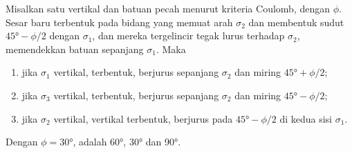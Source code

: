 \begin{theorem}\label{thm:b1:faults-folds-fabrics:anderson}
Misalkan satu  vertikal dan batuan pecah menurut kriteria Coulomb, dengan  $\phi$. Sesar baru terbentuk pada bidang yang memuat arah $\sigma_2$ dan membentuk sudut $\ang{45} - \phi/2$ dengan $\sigma_1$, dan mereka tergelincir tegak lurus terhadap $\sigma_2$, memendekkan batuan sepanjang $\sigma_1$. Maka
\begin{enumerate}[label=(\alph*)]
  \item jika $\sigma_1$ vertikal,  terbentuk, berjurus sepanjang $\sigma_2$ dan miring $\ang{45} + \phi/2$;
  \item jika $\sigma_3$ vertikal,  terbentuk, berjurus sepanjang $\sigma_2$ dan miring $\ang{45} - \phi/2$;
  \item jika $\sigma_2$ vertikal,  vertikal terbentuk, berjurus pada $\ang{45} - \phi/2$ di kedua sisi $\sigma_1$.
\end{enumerate}
Dengan $\phi = \ang{30}$,  adalah \ang{60}, \ang{30} dan \ang{90}.
\end{theorem}

